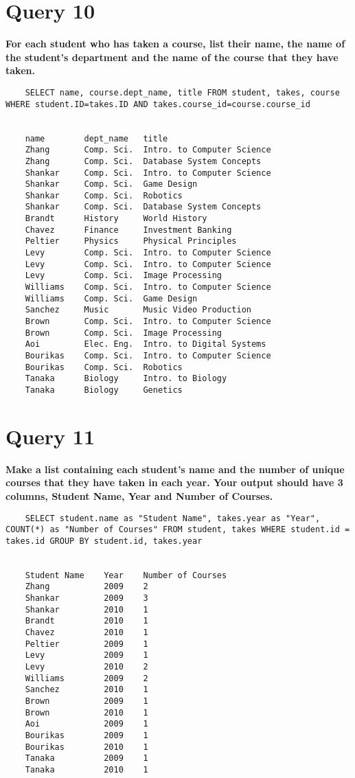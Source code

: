 \documentclass[letterpaper]{article}
\begin{document}
\section{Query 10}

    \textbf{For each student who has taken a course, list their name, the name of the student's department and the name of the course that they have taken.}
    \begin{lstlisting}
    SELECT name, course.dept_name, title FROM student, takes, course WHERE student.ID=takes.ID AND takes.course_id=course.course_id
    
    
    name    	dept_name	title	
    Zhang	    Comp. Sci.	Intro. to Computer Science	
    Zhang   	Comp. Sci.	Database System Concepts	
    Shankar 	Comp. Sci.	Intro. to Computer Science	
    Shankar 	Comp. Sci.	Game Design	
    Shankar 	Comp. Sci.	Robotics	
    Shankar 	Comp. Sci.	Database System Concepts	
    Brandt  	History	    World History	
    Chavez  	Finance	    Investment Banking	
    Peltier 	Physics	    Physical Principles	
    Levy    	Comp. Sci.	Intro. to Computer Science	
    Levy    	Comp. Sci.	Intro. to Computer Science	
    Levy    	Comp. Sci.	Image Processing	
    Williams	Comp. Sci.	Intro. to Computer Science	
    Williams	Comp. Sci.	Game Design	
    Sanchez 	Music	    Music Video Production	
    Brown   	Comp. Sci.	Intro. to Computer Science	
    Brown   	Comp. Sci.	Image Processing	
    Aoi 	    Elec. Eng.	Intro. to Digital Systems	
    Bourikas    Comp. Sci.	Intro. to Computer Science	
    Bourikas    Comp. Sci.	Robotics	
    Tanaka  	Biology	    Intro. to Biology	
    Tanaka  	Biology	    Genetics       
    \end{lstlisting}
        
\section{Query 11}

    \textbf{Make a list containing each student's name and the number of unique courses that they have taken in each year.  Your output should have 3 columns, Student Name, Year and Number of Courses.}
    \begin{lstlisting}
    SELECT student.name as "Student Name", takes.year as "Year", COUNT(*) as "Number of Courses" FROM student, takes WHERE student.id = takes.id GROUP BY student.id, takes.year
    
    
    Student Name	Year	Number of Courses	
    Zhang	        2009	2	
    Shankar	        2009	3	
    Shankar	        2010	1	
    Brandt	        2010	1	
    Chavez	        2010	1	
    Peltier	        2009	1	
    Levy	        2009	1	
    Levy	        2010	2	
    Williams	    2009	2	
    Sanchez	        2010	1	
    Brown	        2009	1	
    Brown	        2010	1	
    Aoi	            2009	1	
    Bourikas        2009	1	
    Bourikas    	2010	1	
    Tanaka	        2009	1	
    Tanaka	        2010	1
    \end{lstlisting}
        
\end{document}
